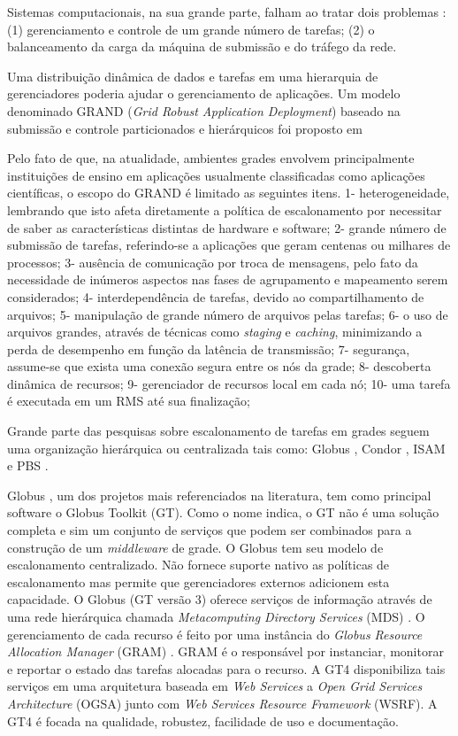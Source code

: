 Sistemas computacionais, na sua grande parte, falham ao tratar dois problemas \cite{Mangan2006}: (1) gerenciamento e controle de um grande número de tarefas; (2) o balanceamento da carga da máquina de submissão e do tráfego da rede.

Uma distribuição dinâmica de dados e tarefas em uma hierarquia de gerenciadores poderia ajudar o gerenciamento de aplicações. Um modelo denominado GRAND (\emph{Grid Robust Application Deployment}) baseado na submissão e controle particionados e hierárquicos foi proposto em \cite{Mangan2006}

Pelo fato de que, na atualidade, ambientes grades envolvem principalmente instituições de ensino em aplicações usualmente classificadas como aplicações científicas, o escopo do GRAND é limitado as seguintes itens. 1- heterogeneidade, lembrando que isto afeta diretamente a política de escalonamento por necessitar de saber as características distintas de hardware e software; 2- grande número de submissão de tarefas, referindo-se a aplicações que geram centenas ou milhares de processos; 3- ausência de comunicação por troca de mensagens, pelo fato da necessidade de inúmeros aspectos nas fases de agrupamento e mapeamento serem considerados; 4- interdependência de tarefas, devido ao compartilhamento de arquivos; 5- manipulação de grande número de arquivos pelas tarefas; 6- o uso de arquivos grandes, através de técnicas como \emph{staging} e \emph{caching}, minimizando a perda de desempenho em função da latência de transmissão; 7- segurança, assume-se que exista uma conexão segura entre os nós da grade; 8- descoberta dinâmica de recursos; 9- gerenciador de recursos local em cada nó; 10- uma tarefa é executada em um RMS até sua finalização;

Grande parte das pesquisas sobre escalonamento de tarefas em grades seguem uma organização hierárquica ou centralizada tais como: Globus \cite{Foster1998}, Condor \cite{condor2007}, ISAM \cite{isam} e PBS \cite{Bayucan1998}.

Globus \cite{Globus}, um dos projetos mais referenciados na literatura, tem como principal software o Globus Toolkit (GT). Como o nome indica, o GT não é uma solução completa e sim um conjunto de serviços que podem ser combinados para a construção de um \emph{middleware} de grade. O Globus \cite{Foster1998} tem seu modelo de escalonamento centralizado. Não fornece suporte nativo as políticas de escalonamento mas permite que gerenciadores externos adicionem esta capacidade. O Globus (GT versão 3) oferece serviços de informação através de uma rede hierárquica chamada \emph{Metacomputing Directory Services} (MDS) \cite{Santos}. O gerenciamento de cada recurso é feito por uma instância do {\it Globus Resource Allocation Manager} (GRAM) \cite{Andrade2002}. GRAM é o responsável por instanciar, monitorar e reportar o estado das tarefas alocadas para o recurso. A GT4 \cite{Leon2006} disponibiliza tais serviços em uma arquitetura baseada em {\it Web Services} a {\it Open Grid Services Architecture} (OGSA) junto com {\it Web Services Resource Framework} (WSRF). A GT4 é focada na qualidade, robustez, facilidade de uso e documentação.

